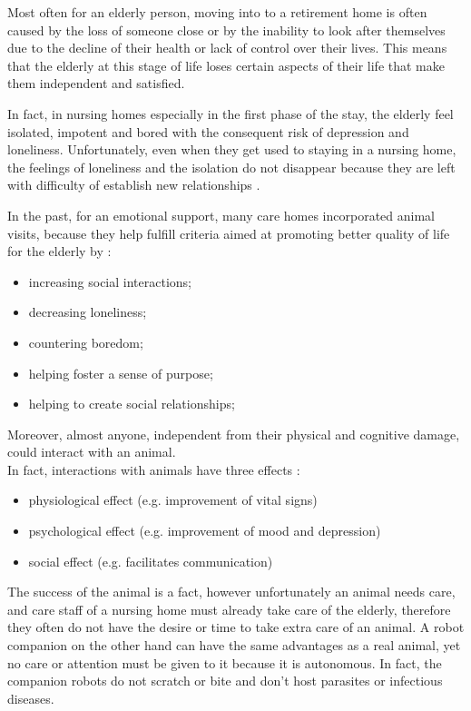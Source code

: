 \documentclass{thesisreport}
\begin{document}
 Most often for an elderly person, moving into to a retirement home is often caused by the loss of someone close or by the inability to look after themselves due to the decline of their health or lack of control over their lives.
 This means that the elderly at this stage of life loses certain aspects of their life that make them independent and satisfied.
 
 In fact, in nursing homes especially in the first phase of the stay, the elderly feel isolated, impotent and bored with the consequent risk of depression and loneliness.
 Unfortunately, even when they get used to staying in a nursing home, the feelings of loneliness and the isolation do not disappear because they are left with difficulty of establish new relationships \cite{assistiveRobots}.
 
 In the past, for an emotional support, many care homes incorporated animal visits, because they help fulfill criteria aimed at promoting better quality of life for the elderly by \cite{psicologicalEffects}:
 \begin{itemize}
     \item increasing social interactions;
     \item decreasing loneliness;
     \item countering boredom;
     \item helping foster a sense of purpose;
     \item helping to create social relationships;
 \end{itemize}
 Moreover, almost anyone, independent from their physical and cognitive damage, could interact with an animal.  \\
 In fact, interactions with animals have three effects \cite{psicologicalEffects}: 
 \begin{itemize}
     \item physiological effect (e.g. improvement of vital signs)
     \item psychological effect (e.g. improvement of mood and depression)
     \item social effect (e.g. facilitates communication)
 \end{itemize}

 The success of the animal is a fact, however unfortunately an animal needs care, and care staff of a nursing home must already take care of the elderly, therefore they often do not have the desire or time to take extra care of an animal.
 A robot companion on the other hand can have the same advantages as a real animal, yet no care or attention must be given to it because it is autonomous.
 In fact, the companion robots do not scratch or bite and don't host parasites or infectious diseases.
 
\end{document}
